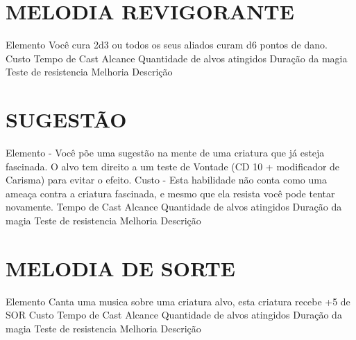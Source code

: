 \documentclass{article}%
\begin{document}
%
\section{MELODIA REVIGORANTE}%
\label{sec:MELODIAREVIGORANTE}%
Elemento Você cura 2d3 ou todos os seus aliados curam d6 pontos de dano.\newline%
Custo \newline%
Tempo de Cast \newline%
Alcance \newline%
Quantidade de alvos atingidos \newline%
Duração da magia \newline%
Teste de resistencia \newline%
Melhoria \newline%
Descrição \newline%

%
\section{SUGESTÃO}%
\label{sec:SUGESTO}%
Elemento {-} Você põe uma sugestão na mente de uma criatura que já esteja fascinada. O alvo tem direito a um teste de Vontade (CD 10 + modificador de Carisma) para evitar o efeito.\newline%
Custo {-} Esta habilidade não conta como uma ameaça contra a criatura fascinada, e mesmo que ela resista você pode tentar novamente.\newline%
Tempo de Cast \newline%
Alcance \newline%
Quantidade de alvos atingidos \newline%
Duração da magia \newline%
Teste de resistencia \newline%
Melhoria \newline%
Descrição \newline%

%
\section{MELODIA DE SORTE}%
\label{sec:MELODIADESORTE}%
Elemento Canta uma musica sobre uma criatura alvo, esta criatura recebe +5 de SOR\newline%
Custo \newline%
Tempo de Cast \newline%
Alcance \newline%
Quantidade de alvos atingidos \newline%
Duração da magia \newline%
Teste de resistencia \newline%
Melhoria \newline%
Descrição \newline%
\end{document}
